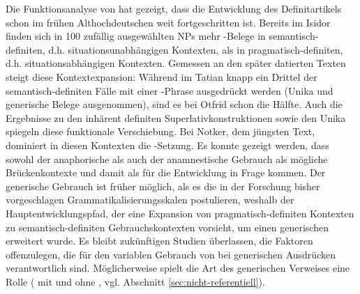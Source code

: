 Die Funktionsanalyse von  hat gezeigt, dass die Entwicklung des Definitartikels schon im frühen Althochdeutschen weit fortgeschritten ist. Bereits im Isidor finden sich in 100 zufällig ausgewählten NPs mehr -Belege in semantisch-definiten, d.h. situationsunabhängigen Kontexten, als in pragmatisch-definiten, d.h. situationsabhängigen Kontexten. Gemessen an den später datierten Texten steigt diese Kontextexpansion: Während im Tatian knapp ein Drittel der se\-man\-tisch-definiten Fälle mit einer -Phrase ausgedrückt werden (Unika und generische Belege ausgenommen), sind es bei Otfrid schon die Hälfte. Auch die Ergebnisse zu den inhärent definiten Superlativkonstruktionen sowie den Unika spiegeln diese funktionale Verschiebung. Bei Notker, dem jüngsten Text, dominiert in diesen Kontexten die -Setzung. Es konnte gezeigt werden, dass sowohl der anaphorische als auch der anamnestische Gebrauch als mögliche Brückenkontexte und damit als  für die Entwicklung in Frage kommen. Der generische Gebrauch ist früher möglich, als es die in der Forschung bisher vorgeschlagen Grammatikalisierungsskalen postulieren, weshalb der Hauptentwicklungspfad, der eine Expansion von pragmatisch-definiten Kontexten zu semantisch-definiten Gebrauchskontexten vorsieht, um einen generischen  erweitert wurde. Es bleibt zukünftigen Studien überlassen, die Faktoren offenzulegen, die für den variablen Gebrauch von  bei generischen Ausdrücken verantwortlich sind. Möglicherweise spielt die Art des generischen Verweises eine Rolle ( mit und ohne , vgl. Abschnitt \ref{sec:nicht-referentiell}). 

